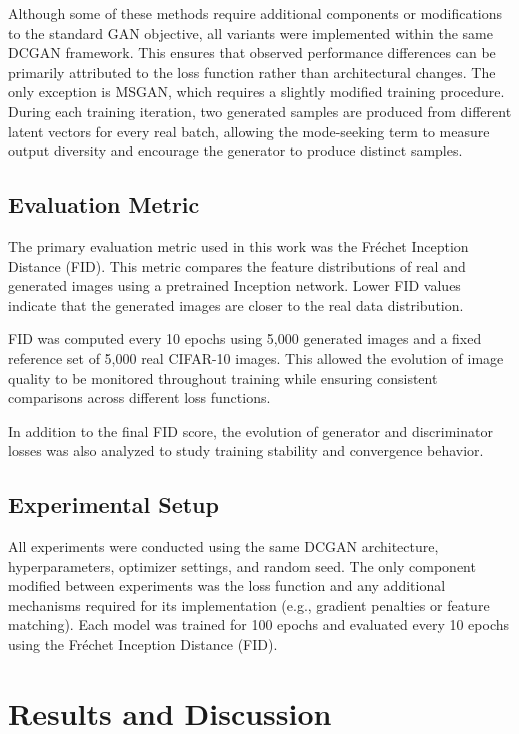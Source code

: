 \documentclass[conference]{IEEEtran}
\begin{document}
Although some of these methods require additional components
or modifications to the standard GAN objective, all variants
were implemented within the same DCGAN framework. This
ensures that observed performance differences can be primarily
attributed to the loss function rather than architectural changes.
The only exception is MSGAN, which requires a slightly
modified training procedure. During each training iteration,
two generated samples are produced from different latent
vectors for every real batch, allowing the mode-seeking term
to measure output diversity and encourage the generator to
produce distinct samples.



\subsection{Evaluation Metric}

The primary evaluation metric used in this work was the
Fréchet Inception Distance (FID). This metric compares the
feature distributions of real and generated images using a
pretrained Inception network. Lower FID values indicate that
the generated images are closer to the real data distribution.

FID was computed every 10 epochs using 5,000 generated
images and a fixed reference set of 5,000 real CIFAR-10
images. This allowed the evolution of image quality to be
monitored throughout training while ensuring consistent
comparisons across different loss functions.

In addition to the final FID score, the evolution of generator
and discriminator losses was also analyzed to study training
stability and convergence behavior.



\subsection{Experimental Setup}

All experiments were conducted using the same DCGAN
architecture, hyperparameters, optimizer settings, and random
seed. The only component modified between experiments was
the loss function and any additional mechanisms required for
its implementation (e.g., gradient penalties or feature matching).
Each model was trained for 100 epochs and evaluated every
10 epochs using the Fréchet Inception Distance (FID).



\section{Results and Discussion}
\end{document}
